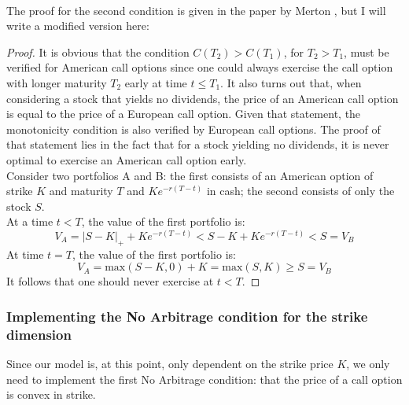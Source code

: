\documentclass[a4paper,12pt]{article}
\begin{document}
~\\
The proof for the second condition is given in the paper by Merton \cite{Merton1973}, but I will write a modified version here:
\begin{proof}
It is obvious that the condition $C(T_2) > C(T_1)$, for $T_2 > T_1$, must be verified for American call options since one could always exercise the call option with longer maturity $T_2$ early at time $t \leq T_1$. It also turns out that, when considering a stock that yields no dividends, the price of an American call option is equal to the price of a European call option. Given that statement, the monotonicity condition is also verified by European call options. The proof of that statement lies in the fact that for a stock yielding no dividends, it is never optimal to exercise an American call option early.\\
Consider two portfolios A and B: the first consists of an American option of strike $K$ and maturity $T$ and $K e^{-r(T-t)}$ in cash; the second consists of only the stock $S$.\\
At a time $t < T$, the value of the first portfolio is:
$$ V_A = |S - K|_{+} + K e^{-r(T-t)} < S - K + K e^{-r(T-t)} < S = V_B $$
At time $t = T$, the value of the first portfolio is:
$$ V_A = \text{max}(S-K, 0) + K = \text{max}(S, K) \geq S = V_B$$
It follows that one should never exercise at $t < T$.
\end{proof}

\subsubsection{Implementing the No Arbitrage condition for the strike dimension}
Since our model is, at this point, only dependent on the strike price $K$, we only need to implement the first No Arbitrage condition: that the price of a call option is convex in strike.
\end{document}
